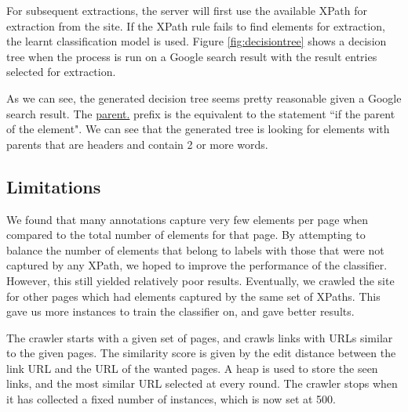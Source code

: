 	
	
	For subsequent extractions, the server will first use the available XPath for extraction from the site. If the XPath rule fails to find elements for extraction, the learnt classification model is used. Figure \ref{fig:decisiontree} shows a decision tree when the process is run on a Google search result with the result entries selected for extraction.
	
	
	As we can see, the generated decision tree seems pretty reasonable given a Google search result. The \url{parent.}	prefix is the equivalent to the statement ``if the parent of the element". We can see that the generated tree is looking for elements with parents that are headers and contain 2 or more words.
	
\subsection{Limitations}
	We found that many annotations capture very few elements per page when compared to the total number of elements for that page. By attempting to balance the number of elements that belong to labels with those that were not captured by any XPath, we hoped to improve the performance of the classifier. However, this still yielded relatively poor results. Eventually, we crawled the site for other pages which had elements captured by the same set of XPaths. This gave us more instances to train the classifier on, and gave better results.
	
	The crawler starts with a given set of pages, and crawls links with URLs similar to the given pages. The similarity score is given by the edit distance between the link URL and the URL of the wanted pages. A heap is used to store the seen links, and the most similar URL selected at every round. The crawler stops when it has collected a fixed number of instances, which is now set at 500.

